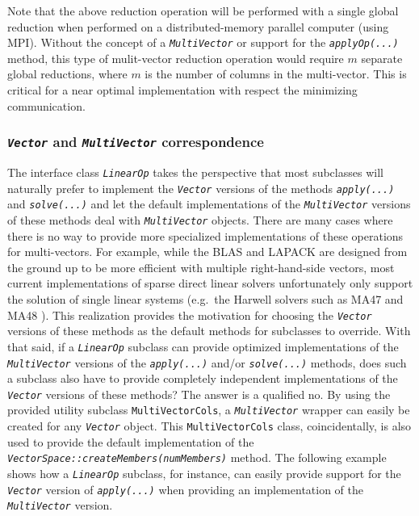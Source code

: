 \documentclass[10pt,fleqn]{article}
\begin{document}
Note that the above reduction operation will be performed with a
single global reduction when performed on a distributed-memory
parallel computer (using MPI).  Without the concept of a
\texttt{\textit{MultiVector}} or support for the
\texttt{\textit{applyOp(...)}} method, this type of mulit-vector
reduction operation would require $m$ separate global reductions,
where $m$ is the number of columns in the multi-vector.  This is
critical for a near optimal implementation with respect the
minimizing communication.

%
\subsubsection{\texttt{\textit{Vector}} and \texttt{\textit{MultiVector}} correspondence}
\label{tsfcore:sec:vector_vs_multivector}
%

The interface class \texttt{\textit{LinearOp}} takes the perspective
that most subclasses will naturally prefer to implement the
\texttt{\textit{Vector}} versions of the methods
\texttt{\textit{apply(...)}} and
\texttt{\textit{solve(...)}} and let the default implementations of the
\texttt{\textit{MultiVector}} versions of these methods deal with
\texttt{\textit{MultiVector}} objects.  There are many cases where there is no
way to provide more specialized implementations of these operations
for multi-vectors.  For example, while the BLAS and LAPACK are
designed from the ground up to be more efficient with multiple
right-hand-side vectors, most current implementations of sparse direct
linear solvers unfortunately only support the solution of single
linear systems (e.g.~the Harwell solvers such as MA47 and MA48
\cite{ref:hsl_1995}).  This realization provides the motivation for
choosing the \texttt{\textit{Vector}} versions of these methods as the
default methods for subclasses to override.  With that said, if a
\texttt{\textit{LinearOp}} subclass can
provide optimized implementations of the \texttt{\textit{MultiVector}}
versions of the \texttt{\textit{apply(...)}} and/or
\texttt{\textit{solve(...)}} methods, does such a subclass
also have to provide completely independent implementations of the
\texttt{\textit{Vector}} versions of these methods?  The answer is a
qualified no.  By using the provided utility subclass
\texttt{MultiVectorCols}, a \texttt{\textit{MultiVector}} wrapper can
easily be created for any \texttt{\textit{Vector}} object.  This
\texttt{MultiVectorCols} class, coincidentally, is also used
to provide the default implementation of the
\texttt{\textit{VectorSpace\-::createMembers(numMembers)}} method.
The following example shows how a
\texttt{\textit{LinearOp}} subclass, for instance, can easily provide
support for the \texttt{\textit{Vector}} version of
\texttt{\textit{apply(...)}} when providing an implementation of the
\texttt{\textit{MultiVector}} version.
\end{document}
